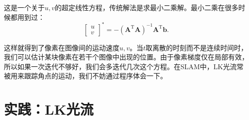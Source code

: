 这是一个关于$u,v$的超定线性方程，传统解法是求最小二乘解。最小二乘在很多时候都用到过：
\begin{equation}
{\left[ \begin{array}{l}
	u\\
	v
	\end{array} \right]^*} = -{\left( {{ \bm{A}^\mathrm{T}}\bm{A}} \right)^{ - 1}}{ \bm{A}^\mathrm{T}}\bm{b}.
\end{equation}

这样就得到了像素在图像间的运动速度$u,v$。当$t$取离散的时刻而不是连续时间时，我们可以估计某块像素在若干个图像中出现的位置。由于像素梯度仅在局部有效，所以如果一次迭代不够好，我们会多迭代几次这个方程。在SLAM中，LK光流常被用来跟踪角点的运动，我们不妨通过程序体会一下。

\section{实践：LK光流}
\label{sec:LKFlow}
%
%
%	
